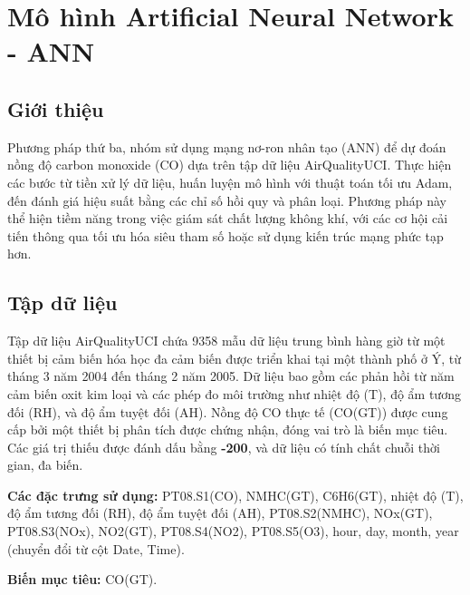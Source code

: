 \section{Mô hình Artificial Neural Network - ANN}
\subsection{Giới thiệu}
Phương pháp thứ ba, nhóm sử dụng mạng nơ-ron nhân tạo (ANN) để dự đoán nồng độ carbon monoxide (CO) dựa trên tập dữ liệu AirQualityUCI. Thực hiện các bước từ tiền xử lý dữ liệu, huấn luyện mô hình với thuật toán tối ưu Adam, đến đánh giá hiệu suất bằng các chỉ số hồi quy và phân loại. Phương pháp này thể hiện tiềm năng trong việc giám sát chất lượng không khí, với các cơ hội cải tiến thông qua tối ưu hóa siêu tham số hoặc sử dụng kiến trúc mạng phức tạp hơn.
\subsection{Tập dữ liệu}
Tập dữ liệu AirQualityUCI chứa 9358 mẫu dữ liệu trung bình hàng giờ từ một thiết bị cảm biến hóa học đa cảm biến được triển khai tại một thành phố ở Ý, từ tháng 3 năm 2004 đến tháng 2 năm 2005. Dữ liệu bao gồm các phản hồi từ năm cảm biến oxit kim loại và các phép đo môi trường như nhiệt độ (T), độ ẩm tương đối (RH), và độ ẩm tuyệt đối (AH). Nồng độ CO thực tế (CO(GT)) được cung cấp bởi một thiết bị phân tích được chứng nhận, đóng vai trò là biến mục tiêu. Các giá trị thiếu được đánh dấu bằng \textbf{-200}, và dữ liệu có tính chất chuỗi thời gian, đa biến.

\textbf{Các đặc trưng sử dụng:} PT08.S1(CO), NMHC(GT), C6H6(GT), nhiệt độ (T), độ ẩm tương đối (RH), độ ẩm tuyệt đối (AH), PT08.S2(NMHC), NOx(GT), PT08.S3(NOx), NO2(GT), PT08.S4(NO2), PT08.S5(O3), hour, day, month, year (chuyển đổi từ cột Date, Time).

\textbf{Biến mục tiêu:}  CO(GT).
